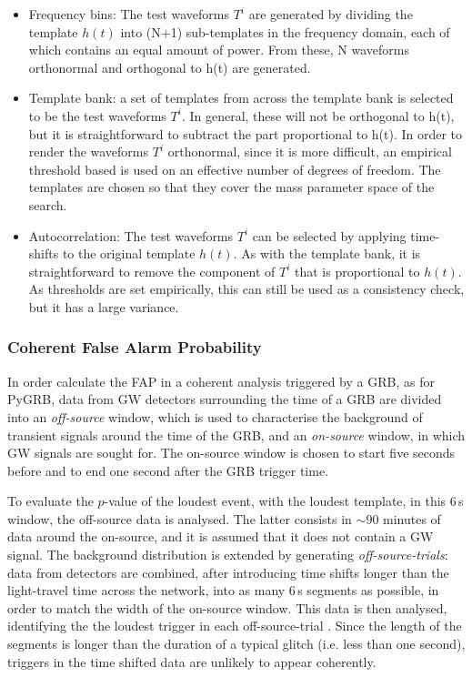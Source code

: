 \documentclass[binding=0.6cm, LaM]{sapthesis}
\begin{document}
        \begin{itemize}
        \item Frequency bins: The test waveforms $T^i$ are generated by dividing the template $h(t)$ into (N+1) 
          sub-templates in the frequency domain, each of which contains an equal amount of power. 
          From these, N waveforms orthonormal and orthogonal to h(t) are generated. 
        \item Template bank: a set of templates from across the template bank is selected to be the test waveforms $T^i$.
          In general, these will not be orthogonal to h(t), but it is straightforward to subtract the part proportional to h(t). 	
          In order to render the waveforms $T^i$ orthonormal, since it is more difficult, 
          an empirical threshold based is used on an effective number of degrees of freedom. 
          The templates are chosen so that they cover the mass parameter space of the search. 
        \item Autocorrelation: The test waveforms $T^i$ can be selected by applying time-shifts to the original template  $h(t)$. 
          As with the template bank, it is straightforward to remove the component of $T^i$ that is proportional to $h(t)$. 
          As thresholds are set empirically, this can still be used as a consistency check, but it has a large variance. 
        \end{itemize}

\subsubsection{Coherent False Alarm Probability}

	In order calculate the FAP in a coherent analysis triggered by a GRB,  
	as for {\ttfamily PyGRB}, data from GW detectors surrounding the time of a GRB 
	are divided into an \textit{off-source} window, which is used to characterise the background 
	of transient signals around the time of the GRB, and an \textit{on-source} window, in
	which GW signals are sought for. 
 	The on-source window is chosen to start five seconds before and to end one second after the GRB trigger time.
	
	To evaluate the $p$-value of the loudest event, with the loudest template,
	in this 6\,s window, the off-source data is analysed.
	The latter consists in $\sim 90$ minutes of data around the on-source, 
	and it is assumed that it does not contain a GW signal.
	The background distribution is extended by generating \textit{off-source-trials}:
	data from detectors are combined, after introducing time shifts longer than the light-travel time across the network,
	into as many 6\,s segments as possible, in order to match the width of the on-source window.
	This data is then analysed, identifying the the loudest trigger in each off-source-trial \cite{46}.
	Since the length of the segments is longer than the duration of a typical glitch (i.e. less than one second),
	triggers in the time shifted data are unlikely to appear coherently. 
\end{document}
